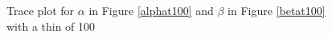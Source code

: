 \documentclass[12pt, leqno]{article}
\begin{document}
\begin{figure}
\centering
{}
\centering
\qquad
\centering
{}
\caption{Trace plot for $\alpha$ in Figure \ref{alphat100} and $\beta$ in Figure \ref{betat100} with a thin of 100}
\end{figure}
\end{document}

